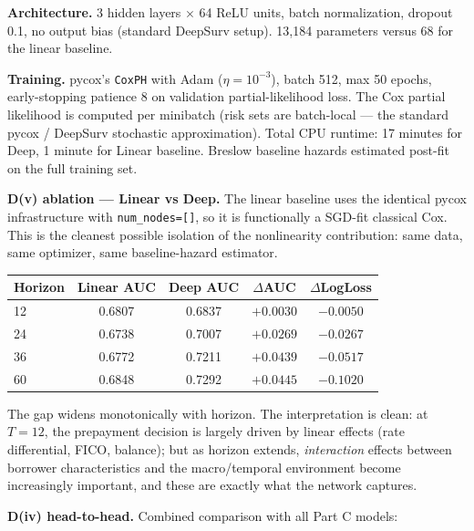 \documentclass[11pt,a4paper]{article}
\begin{document}
\textbf{Architecture.} 3 hidden layers $\times$ 64 ReLU units, batch normalization, dropout 0.1, no output bias (standard DeepSurv setup). 13{,}184 parameters versus 68 for the linear baseline.

\textbf{Training.} pycox's \texttt{CoxPH} with Adam ($\eta = 10^{-3}$), batch 512, max 50 epochs, early-stopping patience 8 on validation partial-likelihood loss. The Cox partial likelihood is computed per minibatch (risk sets are batch-local --- the standard pycox / DeepSurv stochastic approximation). Total CPU runtime: 17 minutes for Deep, 1 minute for Linear baseline. Breslow baseline hazards estimated post-fit on the full training set.

\textbf{D(v) ablation --- Linear vs Deep.} The linear baseline uses the identical pycox infrastructure with \texttt{num\_nodes=[]}, so it is functionally a SGD-fit classical Cox. This is the cleanest possible isolation of the nonlinearity contribution: same data, same optimizer, same baseline-hazard estimator.

\begin{center}
  \small
  \begin{tabular}{lcccc}
    \toprule
    Horizon & Linear AUC & Deep AUC & $\Delta$AUC & $\Delta$LogLoss \\
    \midrule
    12      & 0.6807     & 0.6837   & $+0.0030$   & $-0.0050$       \\
    24      & 0.6738     & 0.7007   & $+0.0269$   & $-0.0267$       \\
    36      & 0.6772     & 0.7211   & $+0.0439$   & $-0.0517$       \\
    60      & 0.6848     & 0.7292   & $+0.0445$   & $-0.1020$       \\
    \bottomrule
  \end{tabular}
\end{center}

The gap widens monotonically with horizon. The interpretation is clean: at $T{=}12$, the prepayment decision is largely driven by linear effects (rate differential, FICO, balance); but as horizon extends, \emph{interaction} effects between borrower characteristics and the macro/temporal environment become increasingly important, and these are exactly what the network captures.

\textbf{D(iv) head-to-head.} Combined comparison with all Part C models:
\end{document}
